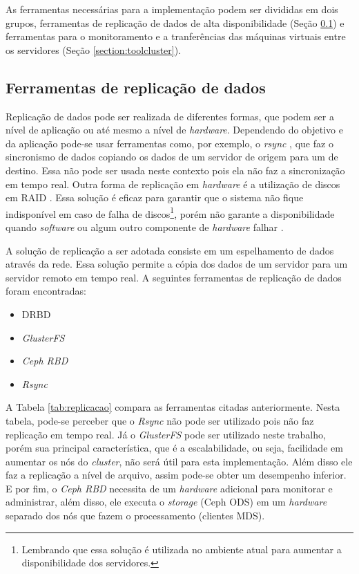 As ferramentas necessárias para a implementação podem ser divididas em dois grupos, ferramentas de replicação de dados de alta disponibilidade
(Seção \ref{section:toolrepl}) e ferramentas para o monitoramento e a tranferências das máquinas virtuais entre os servidores 
(Seção \ref{section:toolcluster}).

\subsection{Ferramentas de replicação de dados}
\label{section:toolrepl}

Replicação de dados pode ser realizada de diferentes formas, que podem ser a nível de aplicação ou até mesmo a nível de \textit{hardware}.
Dependendo do objetivo e da aplicação pode-se usar ferramentas como, por exemplo, o \textit{rsync} \cite{rsync}, que faz o sincronismo de dados 
copiando os dados de um servidor de origem para um de destino. Essa não pode ser usada neste contexto pois ela não faz a sincronização em tempo
real. Outra forma de replicação em \textit{hardware} é a utilização de discos em \ac{RAID} \cite{raid}. Essa solução é eficaz para garantir que 
o sistema não fique indisponível em caso de falha de discos\footnote{Lembrando que essa solução é utilizada no ambiente atual para aumentar a 
disponibilidade dos servidores.}, porém não garante a disponibilidade quando \textit{software} ou algum outro componente de \textit{hardware} 
falhar \cite{zaminhani2008}.

A solução de replicação a ser adotada consiste em um espelhamento de dados através da rede. Essa solução permite a cópia dos dados de um servidor
para um servidor remoto em tempo real. A seguintes ferramentas de replicação de dados foram encontradas:
\begin{itemize}
 \item \ac{DRBD} \cite{drbd}
 \item \textit{GlusterFS} \cite{glusterfs}
 \item \textit{Ceph RBD} \cite{cephrbd}
 \item \textit{Rsync} \cite{rsync}
\end{itemize}

A Tabela \ref{tab:replicacao} compara as ferramentas citadas anteriormente. Nesta tabela, pode-se perceber que o \textit{Rsync} não pode ser
utilizado pois não faz replicação em tempo real. Já o \textit{GlusterFS} pode ser utilizado neste trabalho, porém sua principal característica, 
que é a escalabilidade, ou seja, facilidade em aumentar os nós do \textit{cluster}, não será útil para esta implementação.
Além disso ele faz a replicação a nível de arquivo, assim pode-se obter um desempenho inferior.
E por fim, o \textit{Ceph RBD} necessita de um \textit{hardware} adicional para monitorar e administrar, além disso, ele executa o 
\textit{storage} (Ceph ODS) em um \textit{hardware} separado dos nós que fazem o processamento (clientes MDS).

